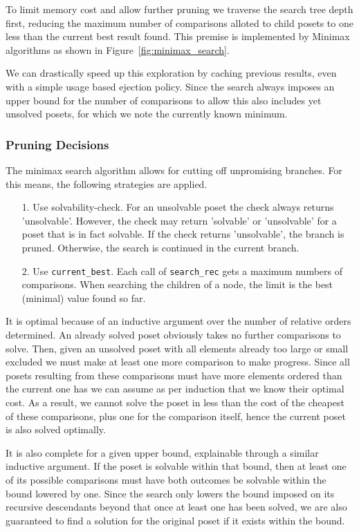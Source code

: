 \documentclass[10pt,journal,compsoc]{IEEEtran}
\begin{document}
To limit memory cost and allow further pruning we traverse the search tree depth first, reducing the maximum number of comparisons alloted to child posets to one less than the current best result found.
This premise is implemented by Minimax algorithms as shown in Figure~\ref{fig:minimax_search}.

We can drastically speed up this exploration by caching previous results, even with a simple usage based ejection policy. Since the search always imposes an upper bound for the number of comparisons to allow this also includes yet unsolved posets, for which we note the currently known minimum.

\subsubsection{Pruning Decisions}
The minimax search algorithm allows for cutting off unpromising branches.
For this means, the following strategies are applied.

\begin{enumerate}
  \item[1.]
        Use solvability-check. For an unsolvable poset the check always returns 'unsolvable'. 
        However, the check may return 'solvable' or 'unsolvable' for a poset that is in fact solvable. 
        If the check returns 'unsolvable', the branch is pruned.
        Otherwise, the search is continued in the current branch.
  \item[2.]
        Use \texttt{current\_best}. Each call of \texttt{search\_rec} gets a maximum numbers of comparisons.
        When searching the children of a node, the limit is the best (minimal) value found so far.
\end{enumerate}

It is optimal because of an inductive argument over the number of relative orders determined.
An already solved poset obviously takes no further comparisons to solve.
Then, given an unsolved poset with all elements already too large or small excluded we must make at least one more comparison to
make progress.
Since all posets resulting from these comparisons must have more elements ordered than the current one has we can assume as per induction that we know their optimal cost.
As a result, we cannot solve the poset in less than the cost of the cheapest of these comparisons, plus one for the comparison itself, hence the current poset is also solved optimally.

It is also complete for a given upper bound, explainable through a similar inductive argument.
If the poset is solvable within that bound, then at least one of its possible comparisons must have both outcomes be solvable within the bound lowered by one.
Since the search only lowers the bound imposed on its recursive descendants beyond that once at least one has been solved, we are also guaranteed to find a solution for the original poset if it exists within the bound.
\end{document}
